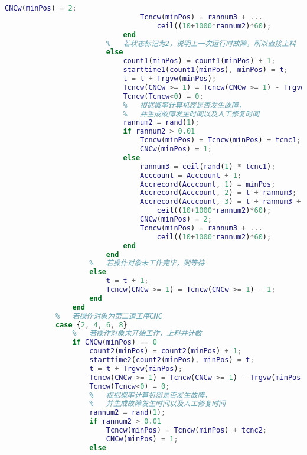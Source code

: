 \documentclass[no-math,withoutpreface,bwprint]{cumcmthesis} %
\numberwithin{equation}{section}
\numberwithin{figure}{section}
\numberwithin{table}{section}
\begin{document}
\begin{lstlisting}[language=matlab]
                                CNCw(minPos) = 2;
                                Tcncw(minPos) = rannum3 + ...
                                    ceil((10+1000*rannum2)*60);
                            end
                        %   若状态标记为2，说明上一次运行时故障，所以直接上料
                        else
                            count1(minPos) = count1(minPos) + 1;
                            starttime1(count1(minPos), minPos) = t;
                            t = t + Trgvw(minPos);
                            Tcncw(CNCw >= 1) = Tcncw(CNCw >= 1) - Trgvw(minPos);
                            Tcncw(Tcncw<0) = 0;
                            %   根据概率计算机器是否发生故障，
                            %   并生成故障发生时间以及人工修复时间
                            rannum2 = rand(1);
                            if rannum2 > 0.01
                                Tcncw(minPos) = Tcncw(minPos) + tcnc1;
                                CNCw(minPos) = 1;
                            else
                                rannum3 = ceil(rand(1) * tcnc1);
                                Acccount = Acccount + 1;
                                Accrecord(Acccount, 1) = minPos;
                                Accrecord(Acccount, 2) = t + rannum3;
                                Accrecord(Acccount, 3) = t + rannum3 + ...
                                    ceil((10+1000*rannum2)*60);
                                CNCw(minPos) = 2;
                                Tcncw(minPos) = rannum3 + ...
                                    ceil((10+1000*rannum2)*60);
                            end
                        end
                    %   若操作对象未工作完毕，则等待
                    else
                        t = t + 1;
                        Tcncw(CNCw >= 1) = Tcncw(CNCw >= 1) - 1;
                    end
                end
            %   若操作对象为第二道工序CNC
            case {2, 4, 6, 8}
                %   若操作对象未开始工作，上料并计数
                if CNCw(minPos) == 0
                    count2(minPos) = count2(minPos) + 1;
                    starttime2(count2(minPos), minPos) = t;
                    t = t + Trgvw(minPos);
                    Tcncw(CNCw >= 1) = Tcncw(CNCw >= 1) - Trgvw(minPos);
                    Tcncw(Tcncw<0) = 0;
                    %   根据概率计算机器是否发生故障，
                    %   并生成故障发生时间以及人工修复时间
                    rannum2 = rand(1);
                    if rannum2 > 0.01
                        Tcncw(minPos) = Tcncw(minPos) + tcnc2;
                        CNCw(minPos) = 1;
                    else

\end{lstlisting}
\end{document}
